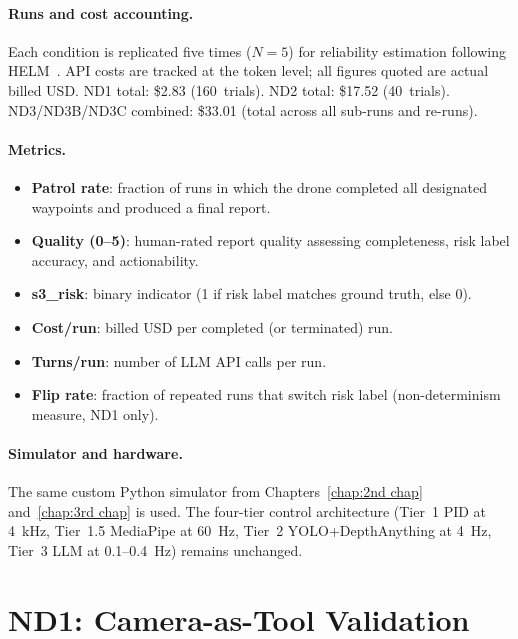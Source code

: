 \paragraph{Runs and cost accounting.}
Each condition is replicated five times ($N=5$) for reliability estimation following
HELM~\cite{liang2023helm}.  API costs are tracked at the token level; all figures quoted
are actual billed USD.  ND1 total: \$2.83 (160~trials).  ND2 total: \$17.52 (40~trials).
ND3/ND3B/ND3C combined: \$33.01 (total across all sub-runs and re-runs).

\paragraph{Metrics.}
\begin{itemize}
  \item \textbf{Patrol rate}: fraction of runs in which the drone completed all designated
    waypoints and produced a final report.
  \item \textbf{Quality (0--5)}: human-rated report quality assessing completeness,
    risk label accuracy, and actionability.
  \item \textbf{s3\_risk}: binary indicator (1 if risk label matches ground truth, else 0).
  \item \textbf{Cost/run}: billed USD per completed (or terminated) run.
  \item \textbf{Turns/run}: number of LLM API calls per run.
  \item \textbf{Flip rate}: fraction of repeated runs that switch risk label
    (non-determinism measure, ND1 only).
\end{itemize}

\paragraph{Simulator and hardware.}
The same custom Python simulator from Chapters~\ref{chap:2nd chap} and~\ref{chap:3rd chap}
is used.  The four-tier control architecture (Tier~1 PID at 4~kHz, Tier~1.5 MediaPipe at
60~Hz, Tier~2 YOLO+DepthAnything at 4~Hz, Tier~3 LLM at 0.1--0.4~Hz) remains unchanged.

\section{ND1: Camera-as-Tool Validation}
\label{sec:ch4_nd1}

